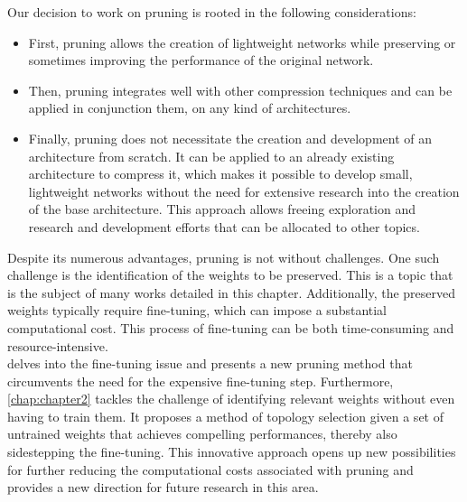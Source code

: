\noindent Our decision to work on pruning is rooted in the following
considerations:
\begin{itemize}
  \item First, pruning allows the creation of lightweight networks while
  preserving or sometimes improving the performance of the original network.

  

  \item Then, pruning integrates well with other compression techniques and can
  be applied in conjunction them, on any kind of architectures.

  \item  Finally, pruning does not necessitate the creation and development of
  an architecture from scratch. It can be applied to an already existing
  architecture to compress it, which makes it possible to develop small,
  lightweight networks without the need for extensive research into the creation
  of the base architecture. This approach allows freeing exploration and
  research and development efforts that can be allocated to other topics.

\end{itemize}

Despite its numerous advantages, pruning is not without challenges. One such
challenge is the identification of the weights to be preserved. This is a topic
that is the subject of many works detailed in this chapter. Additionally, the
preserved weights typically require fine-tuning, which can impose a substantial
computational cost. This process of fine-tuning can be both time-consuming and
resource-intensive.\\

 delves into the fine-tuning issue and presents a new
pruning method that circumvents the need for the expensive fine-tuning step.
Furthermore, \cref{chap:chapter2} tackles the challenge of identifying relevant
weights without even having to train them. It proposes a method of topology
selection given a set of untrained weights that achieves compelling
performances, thereby also sidestepping the fine-tuning. This innovative
approach opens up new possibilities for further reducing the computational costs
associated with pruning and provides a new direction for future research in this
area.\\

